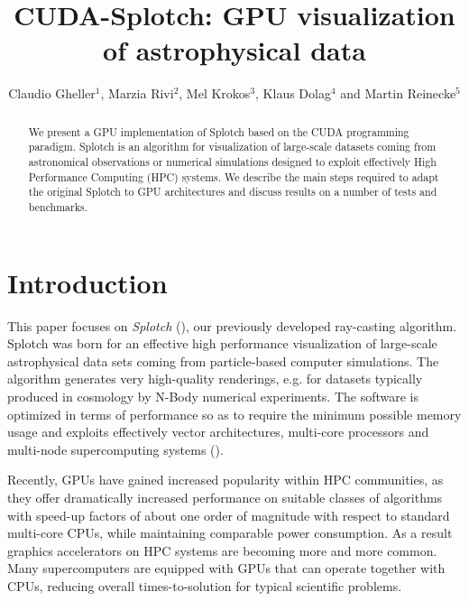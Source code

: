 \documentclass[11pt,twoside]{article}
\begin{document}
\title{CUDA-Splotch: GPU visualization of astrophysical data}
\author{Claudio Gheller$^1$, Marzia Rivi$^2$, Mel Krokos$^3$, Klaus Dolag$^4$ and Martin Reinecke$^5$
}

\begin{abstract}

We present a GPU implementation of Splotch based on the CUDA programming paradigm. Splotch is an algorithm for visualization of large-scale datasets coming from astronomical observations or numerical simulations designed to exploit effectively High Performance Computing (HPC) systems.
We describe the main steps required to adapt the original Splotch to GPU architectures and discuss results on a number of tests and benchmarks.

\end{abstract}

\section{Introduction}

This paper focuses on {\it Splotch} (\citet{2008NJPh...10l5006D}), 
our previously developed ray-casting
algorithm. Splotch was born for an effective high performance visualization of large-scale
astrophysical data sets coming from particle-based computer simulations. 
The algorithm generates very high-quality renderings, e.g. for datasets typically produced in cosmology by N-Body numerical experiments.
The software is optimized in terms of performance so as to require the minimum possible
memory usage and exploits effectively vector architectures, multi-core processors
and multi-node supercomputing systems (\citet{jin:high-performance}).

Recently, GPUs have
gained increased popularity within HPC
communities, as they offer dramatically increased performance on suitable
classes of algorithms with speed-up factors of about one order of magnitude with respect to standard multi-core CPUs, while maintaining comparable power consumption.
As a result graphics accelerators on HPC systems are becoming more and more common. Many supercomputers are equipped with GPUs that can operate together with CPUs, reducing overall times-to-solution
for typical scientific problems.
\end{document}

